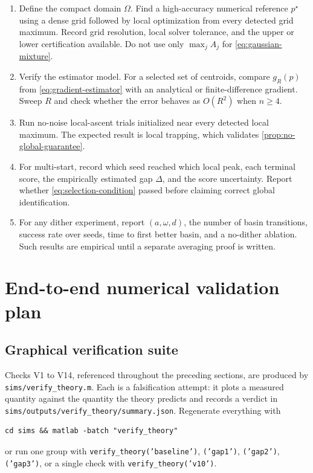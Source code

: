 \documentclass[11pt]{article}
\newcommand{\NotationContext}[1]{\markboth{#1}{#1}}
\begin{document}
\begin{enumerate}
    \item Define the compact domain $\Omega$. Find a high-accuracy numerical reference $p^\star$ using a dense grid followed by local optimization from every detected grid maximum. Record grid resolution, local solver tolerance, and the upper or lower certification available. Do not use only $\max_jA_j$ for \eqref{eq:gaussian-mixture}.
    \item Verify the estimator model. For a selected set of centroids, compare $g_R(p)$ from \eqref{eq:gradient-estimator} with an analytical or finite-difference gradient. Sweep $R$ and check whether the error behaves as $O(R^2)$ when $n\geq4$.
    \item Run no-noise local-ascent trials initialized near every detected local maximum. The expected result is local trapping, which validates \cref{prop:no-global-guarantee}.
    \item For multi-start, record which seed reached which local peak, each terminal score, the empirically estimated gap $\Delta$, and the score uncertainty. Report whether \eqref{eq:selection-condition} passed before claiming correct global identification.
    \item For any dither experiment, report $(a,\omega,d)$, the number of basin transitions, success rate over seeds, time to first better basin, and a no-dither ablation. Such results are empirical until a separate averaging proof is written.
\end{enumerate}

\section{End-to-end numerical validation plan}\label{sec:validation}
\NotationContext{valid}

\subsection{Graphical verification suite}\label{sec:verification-suite}

Checks V1 to V14, referenced throughout the preceding sections, are produced by \texttt{sims/verify\_theory.m}. Each is a falsification attempt: it plots a measured quantity against the quantity the theory predicts and records a verdict in \texttt{sims/outputs/verify\_theory/summary.json}. Regenerate everything with
\begin{verbatim}
cd sims && matlab -batch "verify_theory"
\end{verbatim}
or run one group with \texttt{verify\_theory('baseline')}, \texttt{('gap1')}, \texttt{('gap2')}, \texttt{('gap3')}, or a single check with \texttt{verify\_theory('v10')}.
\end{document}
